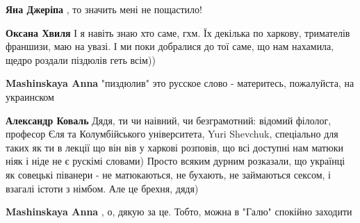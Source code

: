 \begin{itemize}
\begin{itemize}
 
\textbf{Яна Джеріпа} , то значить мені не пощастило!

 
\textbf{Оксана Хвиля} І я навіть знаю хто саме, гхм. Їх декілька по харкову, тримателів франшизи, маю на увазі. І ми поки добралися до тої саме, що нам нахамила, щедро роздали піздюлів геть всім))

 
\textbf{Mashinskaya Anna} "пиздюлив" это русское слово - материтесь, пожалуйста, на украинском

 
\textbf{Александр Коваль} Дядя, ти чи наівний, чи безграмотний: відомий
філолог, професор Єля та Колумбійського університета, Yuri Shevchuk, спеціально
для таких як ти в лекції що він вів у харкові розповів, що всі доступні нам
матюки ніяк і ніде не є рускімі словами) Просто всяким дурним розказали, що
українці як совецькі піванери - не матюкаються, не бухають, не займаються
сексом, і взагалі істоти з німбом. Але це брехня, дядя)

 
\textbf{Mashinskaya Anna} , о, дякую за це. Тобто, можна в "Галю" спокійно заходити

\end{itemize}


\end{itemize}
